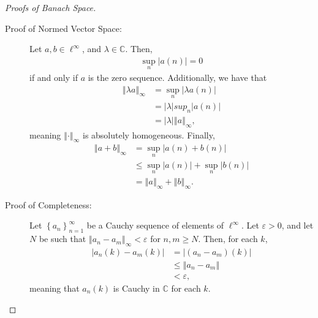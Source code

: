 \documentclass[10pt]{extarticle}
\newcommand{\C}{\mathbb{C}}
\newcommand{\norm}[1]{\left\Vert #1\right\Vert}
\newcommand{\set}[1]{\left\{#1\right\}}
\newcommand{\ve}{\varepsilon}
\theoremstyle{plain}
\theoremstyle{definition}
\theoremstyle{note}
\renewcommand{\newline}{\hfill\break}
\begin{document}
\begin{proof}[Proofs of Banach Space]\hfill
  \begin{description}[font = \normalfont]
    \item[$\ell^{\infty}$:]\hfill
      \begin{description}
        \item[Proof of Normed Vector Space:] Let $a,b\in \ell^{\infty}$, and $\lambda \in \C$. Then,
          \begin{align*}
            \sup_{n}|a(n)| = 0
          \end{align*}
          if and only if $a$ is the zero sequence. Additionally, we have that
          \begin{align*}
            \norm{\lambda a}_{\infty} &= \sup_{n}\left\vert \lambda a(n) \right\vert\\
                             &= |\lambda|sup_{n}|a(n)|\\
                             &= |\lambda|\norm{a}_{\infty},
          \end{align*}
          meaning $\norm{\cdot}_{\infty}$ is absolutely homogeneous. Finally,
          \begin{align*}
            \norm{a + b}_{\infty} &= \sup_{n}\left\vert a(n) + b(n) \right\vert\\
                         &\leq \sup_{n}\left\vert a(n) \right\vert + \sup_{n}\left\vert b(n) \right\vert\\
                         &= \norm{a}_{\infty} + \norm{b}_{\infty}.
          \end{align*}
        \item[Proof of Completeness:] Let $\set{a_n}_{n=1}^{\infty}$ be a Cauchy sequence of elements of $\ell^{\infty}$. Let $\ve > 0$, and let $N$ be such that $\norm{a_n - a_m}_{\infty} < \varepsilon$ for $n,m \geq N$. Then, for each $k$,
          \begin{align*}
            \left\vert a_{n}(k) - a_m(k) \right\vert &= \left\vert (a_n - a_m)(k) \right\vert\\
                                                     &\leq \norm{a_n - a_m}\\
                                                     &< \varepsilon,
          \end{align*}
          meaning that $a_n(k)$ is Cauchy in $\C$ for each $k$.\newline


\end{description}
\end{description}
\end{proof}
\end{document}
